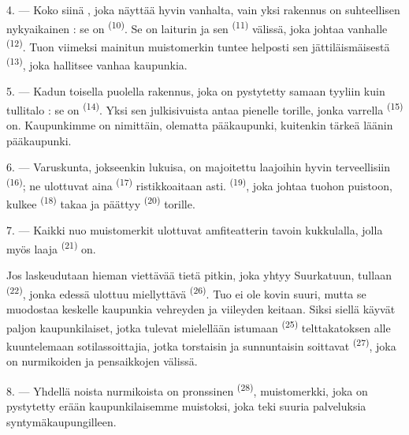 4. --- Koko siinä , joka näyttää hyvin vanhalta, vain
yksi rakennus on suhteellisen nykyaikainen : se on 
\textsuperscript{(10)}. Se on laiturin ja sen 
\textsuperscript{(11)} välissä, joka johtaa vanhalle 
\textsuperscript{(12)}. Tuon viimeksi mainitun muistomerkin tuntee helposti sen
jättiläismäisestä  \textsuperscript{(13)}, joka hallitsee
vanhaa kaupunkia.

5. --- Kadun toisella puolella  rakennus, joka on pystytetty
samaan tyyliin kuin tullitalo : se on  \textsuperscript{(14)}.
Yksi sen julkisivuista antaa pienelle torille, jonka varrella
 \textsuperscript{(15)} on. Kaupunkimme on nimittäin,
olematta pääkaupunki, kuitenkin tärkeä läänin pääkaupunki.

\VUsaut{5.0mm}
\VUsaut{3.4mm}

6. --- Varuskunta, jokseenkin lukuisa, on majoitettu laajoihin hyvin terveellisiin
 \textsuperscript{(16)}; ne ulottuvat aina
 \textsuperscript{(17)} ristikkoaitaan asti.
 \textsuperscript{(19)}, joka johtaa tuohon puistoon, kulkee
 \textsuperscript{(18)} takaa ja päättyy
 \textsuperscript{(20)} torille.

7. --- Kaikki nuo muistomerkit ulottuvat amfiteatterin tavoin kukkulalla, jolla
myös laaja  \textsuperscript{(21)} on.

Jos laskeudutaan hieman viettävää tietä pitkin, joka yhtyy Suurkatuun, tullaan
 \textsuperscript{(22)}, jonka edessä ulottuu miellyttävä
 \textsuperscript{(26)}. Tuo  ei ole
kovin suuri, mutta se muodostaa keskelle kaupunkia vehreyden ja viileyden
keitaan. Siksi siellä käyvät paljon kaupunkilaiset, jotka tulevat mielellään
istumaan  \textsuperscript{(25)} telttakatoksen alle
kuuntelemaan sotilassoittajia, jotka torstaisin ja sunnuntaisin soittavat
 \textsuperscript{(27)}, joka on nurmikoiden ja pensaikkojen
välissä.

8. --- Yhdellä noista nurmikoista on pronssinen 
\textsuperscript{(28)}, muistomerkki, joka on pystytetty erään kaupunkilaisemme
muistoksi, joka teki suuria palveluksia syntymäkaupungilleen.

